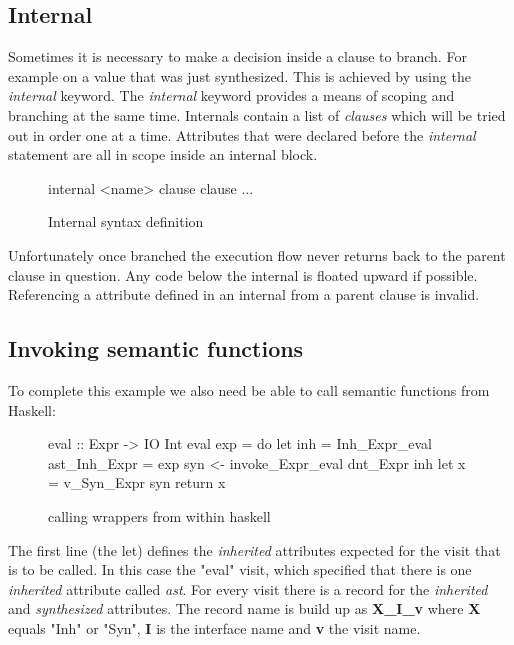 \subsection{Internal}
Sometimes it is necessary to make a decision inside a clause to branch. For example on a value that was just synthesized. This is achieved by using the \emph{internal} keyword. The \emph{internal} keyword provides a means of scoping and branching at the same time. Internals contain a list of \emph{clauses} which will be tried out in order one at a time. Attributes that were declared before the \emph{internal} statement are all in scope inside an internal block. 

\begin{figure}[h!]
\begin{code}
internal <name>
  {clause}
  {clause}
  ...
\end{code}
\caption{Internal syntax definition}
\label{internal:syntax}
\end{figure}

Unfortunately once branched the execution flow never returns back to the parent clause in question. Any code below the internal is floated upward if possible. Referencing a attribute defined in an internal from a parent clause is invalid.

\subsection{Invoking semantic functions}
To complete this example we also need be able to call semantic functions from Haskell:

\begin{figure}[H]
\begin{code}
eval :: Expr -> IO Int
eval exp = do
  let inh = Inh_Expr_eval { ast_Inh_Expr = exp }
  syn <- invoke_Expr_eval dnt_Expr inh
  let x = v_Syn_Expr syn
  return x
\end{code}
\caption{calling wrappers from within haskell}
\end{figure}

The first line (the let) defines the \emph{inherited} attributes expected for the visit that is to be called. In this case the "eval" visit, which specified that there is one \emph{inherited} attribute called \emph{ast}. For every visit there is a record for the \emph{inherited} and \emph{synthesized} attributes. The record name is build up as \textbf{X\_I\_v} where \textbf{X} equals "Inh" or "Syn", \textbf{I} is the interface name and \textbf{v} the visit name.

